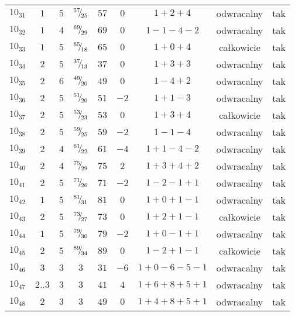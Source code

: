 \begin{longtable}{ccccccccc}
$10_{31}$ & $1$ & $5$ & ${}^{57}{\mskip -5mu/\mskip -3mu}_{25}$ & $57$ & $0$ & $1+2+4$ & odwracalny & tak \\
$10_{32}$ & $1$ & $4$ & ${}^{69}{\mskip -5mu/\mskip -3mu}_{29}$ & $69$ & $0$ & $1-1-4-2$ & odwracalny & tak \\
$10_{33}$ & $1$ & $5$ & ${}^{65}{\mskip -5mu/\mskip -3mu}_{18}$ & $65$ & $0$ & $1+0+4$ & całkowicie & tak \\
$10_{34}$ & $2$ & $5$ & ${}^{37}{\mskip -5mu/\mskip -3mu}_{13}$ & $37$ & $0$ & $1+3+3$ & odwracalny & tak \\
$10_{35}$ & $2$ & $6$ & ${}^{49}{\mskip -5mu/\mskip -3mu}_{20}$ & $49$ & $0$ & $1-4+2$ & odwracalny & tak \\
$10_{36}$ & $2$ & $5$ & ${}^{51}{\mskip -5mu/\mskip -3mu}_{20}$ & $51$ & $-2$ & $1+1-3$ & odwracalny & tak \\
$10_{37}$ & $2$ & $5$ & ${}^{53}{\mskip -5mu/\mskip -3mu}_{23}$ & $53$ & $0$ & $1+3+4$ & całkowicie & tak \\
$10_{38}$ & $2$ & $5$ & ${}^{59}{\mskip -5mu/\mskip -3mu}_{25}$ & $59$ & $-2$ & $1-1-4$ & odwracalny & tak \\
$10_{39}$ & $2$ & $4$ & ${}^{61}{\mskip -5mu/\mskip -3mu}_{22}$ & $61$ & $-4$ & $1+1-4-2$ & odwracalny & tak \\
$10_{40}$ & $2$ & $4$ & ${}^{75}{\mskip -5mu/\mskip -3mu}_{29}$ & $75$ & $2$ & $1+3+4+2$ & odwracalny & tak \\
$10_{41}$ & $2$ & $5$ & ${}^{71}{\mskip -5mu/\mskip -3mu}_{26}$ & $71$ & $-2$ & $1-2-1+1$ & odwracalny & tak \\
$10_{42}$ & $1$ & $5$ & ${}^{81}{\mskip -5mu/\mskip -3mu}_{31}$ & $81$ & $0$ & $1+0+1-1$ & odwracalny & tak \\
$10_{43}$ & $2$ & $5$ & ${}^{73}{\mskip -5mu/\mskip -3mu}_{27}$ & $73$ & $0$ & $1+2+1-1$ & całkowicie & tak \\
$10_{44}$ & $1$ & $5$ & ${}^{79}{\mskip -5mu/\mskip -3mu}_{30}$ & $79$ & $-2$ & $1+0-1+1$ & odwracalny & tak \\
$10_{45}$ & $2$ & $5$ & ${}^{89}{\mskip -5mu/\mskip -3mu}_{34}$ & $89$ & $0$ & $1-2+1-1$ & całkowicie & tak \\
$10_{46}$ & $3$ & $3$ & $3$ & $31$ & $-6$ & $1+0-6-5-1$ & odwracalny & tak \\
$10_{47}$ & $2..3$ & $3$ & $3$ & $41$ & $4$ & $1+6+8+5+1$ & odwracalny & tak \\
$10_{48}$ & $2$ & $3$ & $3$ & $49$ & $0$ & $1+4+8+5+1$ & odwracalny & tak \\

\end{longtable}
